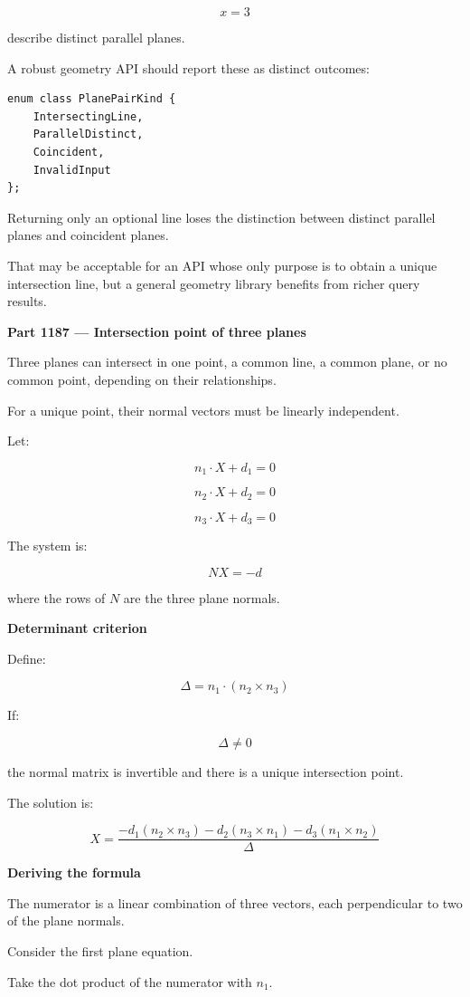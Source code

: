 \[
x=3
\]

describe distinct parallel planes.

A robust geometry API should report these as distinct outcomes:

\begin{verbatim}
enum class PlanePairKind {
    IntersectingLine,
    ParallelDistinct,
    Coincident,
    InvalidInput
};
\end{verbatim}

Returning only an optional line loses the distinction between distinct parallel planes and coincident planes.

That may be acceptable for an API whose only purpose is to obtain a unique intersection line, but a general geometry library benefits from richer query results.

\textbf{Part 1187 --- Intersection point of three planes}

Three planes can intersect in one point, a common line, a common plane, or no common point, depending on their relationships.

For a unique point, their normal vectors must be linearly independent.

Let:

\[
n_1\cdot X+d_1=0
\]

\[
n_2\cdot X+d_2=0
\]

\[
n_3\cdot X+d_3=0
\]

The system is:

\[
NX=-d
\]

where the rows of \(N\) are the three plane normals.

\textbf{Determinant criterion}

Define:

\[
\boxed{ \Delta=n_1\cdot(n_2\times n_3) }
\]

If:

\[
\Delta\ne0
\]

the normal matrix is invertible and there is a unique intersection point.

The solution is:

\[
\boxed{ X= \frac{ -d_1(n_2\times n_3) -d_2(n_3\times n_1) -d_3(n_1\times n_2) }{ \Delta } }
\]

\textbf{Deriving the formula}

The numerator is a linear combination of three vectors, each perpendicular to two of the plane normals.

Consider the first plane equation.

Take the dot product of the numerator with \(n_1\).

